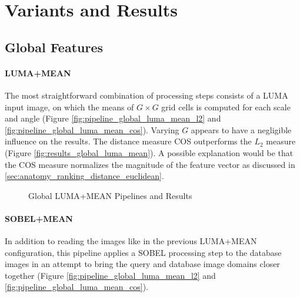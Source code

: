 \section{Variants and Results}\label{sec:results}

\subsection{Global Features}

\paragraph{LUMA+MEAN}

The most straightforward combination of processing steps consists of a LUMA
input image, on which the means of $G \times G$ grid cells is computed for each
scale and angle (Figure \ref{fig:pipeline_global_luma_mean_l2} and
\ref{fig:pipeline_global_luma_mean_cos}). Varying $G$ appears to have a
negligible influence on the results. The distance measure COS outperforms the
$L_2$ measure (Figure \ref{fig:results_global_luma_mean}). A possible
explanation would be that the COS measure normalizes the magnitude of the
feature vector as discussed in \ref{sec:anatomy_ranking_distance_euclidean}.

\begin{figure}[h]
    \centering
    \quad
    \quad
    \caption[Global LUMA+MEAN Pipelines and Results]{
        Global LUMA+MEAN Pipelines and Results
    }
    \label{fig:pipeline_global_luma_mean}
\end{figure}

\paragraph{SOBEL+MEAN}

In addition to reading the images like in the previous LUMA+MEAN configuration,
this pipeline applies a SOBEL processing step to the database images in an
attempt to bring the query and database image domains closer together (Figure
\ref{fig:pipeline_global_luma_mean_l2} and
\ref{fig:pipeline_global_luma_mean_cos}).

